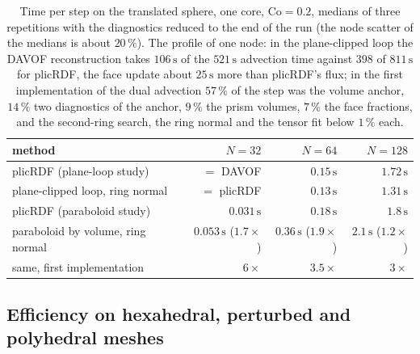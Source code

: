 \documentclass[preprint,12pt]{elsarticle}
\begin{document}
\begin{table}[htbp]
\centering
\caption{Time per step on the translated sphere, one core, $\mathrm{Co} = 0.2$, medians of three repetitions with the diagnostics reduced to the end of the run (the node scatter of the medians is about $20\,\%$). The profile of one node: in the plane-clipped loop the DAVOF reconstruction takes $106\,\mathrm{s}$ of the $521\,\mathrm{s}$ advection time against $398$ of $811\,\mathrm{s}$ for plicRDF, the face update about $25\,\mathrm{s}$ more than plicRDF's flux; in the first implementation of the dual advection $57\,\%$ of the step was the volume anchor, $14\,\%$ two diagnostics of the anchor, $9\,\%$ the prism volumes, $7\,\%$ the face fractions, and the second-ring search, the ring normal and the tensor fit below $1\,\%$ each.}
\label{tab:tpf-cost}
\footnotesize
\begin{tabular}{lrrr}
\toprule
method & $N = 32$ & $N = 64$ & $N = 128$ \\
\midrule
plicRDF (plane-loop study) & $=$ DAVOF & $0.15\,\mathrm{s}$ & $1.72\,\mathrm{s}$ \\
plane-clipped loop, ring normal & $=$ plicRDF & $0.13\,\mathrm{s}$ & $1.31\,\mathrm{s}$ \\
\midrule
plicRDF (paraboloid study) & $0.031\,\mathrm{s}$ & $0.18\,\mathrm{s}$ & $1.8\,\mathrm{s}$ \\
paraboloid by volume, ring normal & $0.053\,\mathrm{s}$ ($1.7\times$) & $0.36\,\mathrm{s}$ ($1.9\times$) & $2.1\,\mathrm{s}$ ($1.2\times$) \\
same, first implementation & $6\times$ & $3.5\times$ & $3\times$ \\
\bottomrule
\end{tabular}
\end{table}

\subsection{Efficiency on hexahedral, perturbed and polyhedral meshes}
\label{sec:tpf-matrix}
\end{document}
